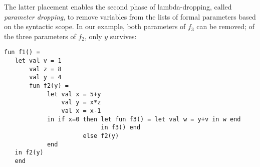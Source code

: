 The latter placement enables the second phase of
lambda-dropping, called
\emph{parameter dropping}, to remove variables from the lists of
formal parameters based on the syntactic scope. In our example, both
parameters of $f_3$ can be removed; of the three parameters of $f_2$,
only $y$ survives:
\begin{verbatim}
fun f1() = 
   let val v = 1 
       val z = 8 
       val y = 4
       fun f2(y) = 
            let val x = 5+y
                val y = x*z
                val x = x-1
            in if x=0 then let fun f3() = let val w = y+v in w end
                           in f3() end
                      else f2(y)
            end
   in f2(y) 
   end
\end{verbatim}
